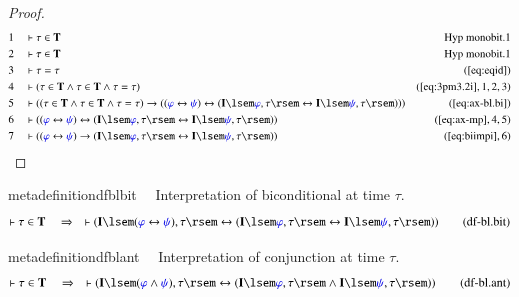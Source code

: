 \begin{proof}
\begin{align}
  1 &&  & \vdash \tau \in
      \mathbf{T}&\text{Hyp~monobit.1}\notag
  \\ 2 &&  & \vdash \tau \in
      \mathbf{T}&\text{Hyp~monobit.1}\notag
  \\ 3 &&  & \vdash \tau = \tau&(\mbox{\ref{eq:eqid}})\notag
  \\ 4 &&  & \vdash ( \tau \in \mathbf{T} \wedge \tau \in \mathbf{T}
      \wedge \tau = \tau )&(\mbox{\ref{eq:3pm3.2i}},1,2,3)\notag
  \\ 5 &&  & \vdash ( ( \tau \in \mathbf{T} \wedge \tau \in \mathbf{T}
      \wedge \tau = \tau ) \rightarrow ( ( \mw{\varphi} \leftrightarrow
      \mw{\psi} ) \leftrightarrow ( \mathbf{I} \lsem \mw{\varphi} ,
      \tau \rsem \leftrightarrow \mathbf{I} \lsem \mw{\psi} , \tau
      \rsem ) ) )&(\mbox{\ref{eq:ax-bl.bi}})\notag
  \\ 6 &&  & \vdash ( ( \mw{\varphi} \leftrightarrow \mw{\psi} )
      \leftrightarrow ( \mathbf{I} \lsem \mw{\varphi} , \tau \rsem
      \leftrightarrow \mathbf{I} \lsem \mw{\psi} , \tau \rsem )
      )&(\mbox{\ref{eq:ax-mp}},4,5)\notag
  \\ 7 &&  & \vdash ( ( \mw{\varphi} \leftrightarrow \mw{\psi} )
      \rightarrow ( \mathbf{I} \lsem \mw{\varphi} , \tau \rsem
      \leftrightarrow \mathbf{I} \lsem \mw{\psi} , \tau \rsem )
      )&(\mbox{\ref{eq:biimpi}},6)\notag
\end{align}
\end{proof}

\begin{restatable}{metadefinition}{dfblbit}~~ Interpretation of biconditional at
time $\tau$.
\begin{align}
\vdash \tau \in \mathbf{T}\quad\Rightarrow\quad \vdash ( \mathbf{I} \lsem (
    \mw{\varphi} \leftrightarrow \mw{\psi} ) , \tau \rsem \leftrightarrow (
    \mathbf{I} \lsem \mw{\varphi} , \tau \rsem \leftrightarrow \mathbf{I} \lsem
    \mw{\psi} , \tau \rsem ) )\label{eq:df-bl.bit}\tag{df-bl.bit}
\end{align}
\end{restatable}

\begin{restatable}{metadefinition}{dfblant}~~ Interpretation of conjunction at time
$\tau$.
\begin{align}
\vdash \tau \in \mathbf{T}\quad\Rightarrow\quad \vdash ( \mathbf{I} \lsem (
    \mw{\varphi} \wedge \mw{\psi} ) , \tau \rsem \leftrightarrow ( \mathbf{I}
    \lsem \mw{\varphi} , \tau \rsem \wedge \mathbf{I} \lsem \mw{\psi} , \tau
    \rsem ) )\label{eq:df-bl.ant}\tag{df-bl.ant}
\end{align}
\end{restatable}

